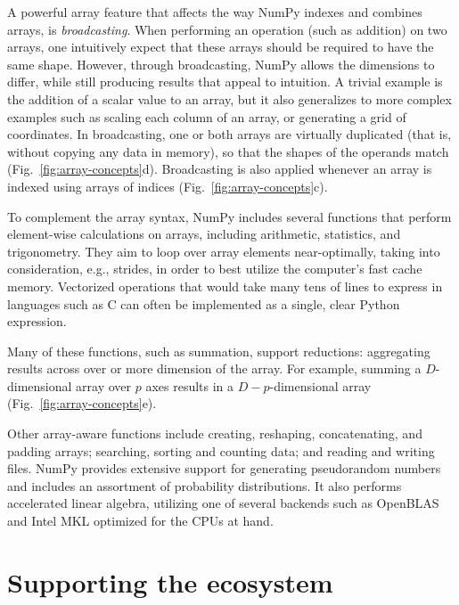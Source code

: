 A powerful array feature that affects the way NumPy indexes and combines
arrays, is {\em broadcasting}.
When performing an operation (such as addition) on two arrays, one intuitively
expect that these arrays should be required to have the same shape.
However, through broadcasting, NumPy allows the dimensions to differ, while
still producing results that appeal to intuition.
A trivial example is the addition of a scalar value to an array, but it also
generalizes to more complex examples such as scaling each column of an array,
or generating a grid of coordinates.
In broadcasting, one or both arrays are virtually duplicated (that is, without
copying any data in memory), so that the shapes of the operands match
(Fig.~\ref{fig:array-concepts}d).
Broadcasting is also applied whenever an array is indexed using arrays of
indices (Fig.~\ref{fig:array-concepts}c).

To complement the array syntax, NumPy includes several functions that perform
element-wise calculations on arrays, including arithmetic, statistics, and
trigonometry.
They aim to loop over array elements near-optimally, taking into consideration,
e.g., strides, in order to best utilize the computer's fast cache memory.
Vectorized operations that would take many tens of lines to express in
languages such as C can often be implemented as a single, clear Python
expression.

Many of these functions, such as summation, support reductions: aggregating
results across over or more dimension of the array.
For example, summing a $D$-dimensional array over $p$ axes results in a
$D-p$-dimensional array (Fig.~\ref{fig:array-concepts}e).

Other array-aware functions include creating, reshaping, concatenating, and padding
arrays; searching, sorting and counting data; and reading and writing files.
NumPy provides extensive support for generating pseudorandom numbers and
includes an assortment of probability distributions.
It also performs accelerated linear algebra, utilizing one of several backends
such as OpenBLAS \cite{wang2013augem,xianyi2012model} and Intel MKL optimized for the CPUs at hand.

\section*{Supporting the ecosystem}



